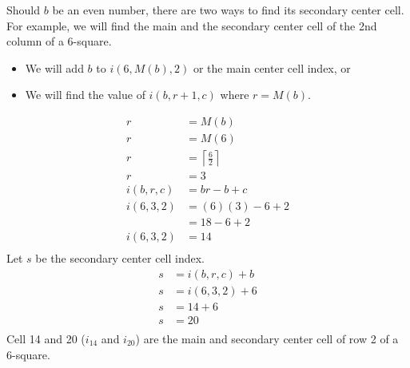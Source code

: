 \documentclass[letterpaper, twoside,12pt]{book}
\begin{document}
    \newpage

    Should $b$ be an even number, there are two ways to find its secondary center cell. For example, we will find the main and the secondary center cell of the 2nd column of a 6-square.
    \begin{itemize}
        \item We will add $b$ to $i(6,M(b),2)$ or the main center cell index, or
        \item We will find the value of $i(b,r+1,c)$ where $r=M(b)$.
    \end{itemize}
    \begin{equation}
        \begin{split}
            r &= M(b) \\
            r &= M(6) \\
            r &= \left\lceil \frac{6}{2} \right\rceil \\
            r &= 3 \\
            i(b,r,c) &= br - b + c \\
            i(6,3,2) &= (6)(3) - 6 + 2 \\
                &= 18 - 6 + 2 \\
            i(6,3,2) &= 14 \\
        \end{split}
    \end{equation}
    Let $s$ be the secondary center cell index.
    \begin{equation}
        \begin{split}
            s &= i(b,r,c) + b\\
            s &= i(6,3,2) + 6\\
            s &= 14 + 6\\
            s &= 20\\
        \end{split}
    \end{equation}
    Cell 14 and 20 ($i_{14}$ and $i_{20}$) are the main and secondary center cell of row 2 of a 6-square.
\end{document}
